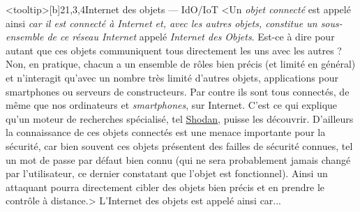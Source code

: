 \begin{quiz}[title={Informatique embarquée et objets connectés}]
\vspace{-\baselineskip}
\begin{quizquestion*}<tooltip>[b]{2}{1,3,4}{Internet des objets --- IdO/IoT}
<Un \emph{objet connecté} est appelé ainsi \emph{car il est connecté à Internet et, avec les autres objets, constitue un sous-ensemble de ce réseau Internet} appelé \emph{Internet des Objets}.
Est-ce à dire pour autant que ces objets communiquent tous directement les uns avec les autres ? Non, en pratique, chacun a un ensemble de rôles bien précis (et limité en général) et n’interagit qu’avec un nombre très limité d’autres objets, applications pour smartphones ou serveurs de constructeurs.
Par contre ils sont tous connectés, de même que nos ordinateurs et \textit{smartphones}, sur Internet. C’est ce qui explique qu’un moteur de recherches spécialisé, tel \href{https://www.shodan.io/}{Shodan}, puisse les découvrir.
D’ailleurs la connaissance de ces objets connectés est une menace importante pour la sécurité, car bien souvent ces objets présentent des failles de sécurité connues, tel un mot de passe par défaut bien connu (qui ne sera probablement jamais changé par l’utilisateur, ce dernier constatant que l’objet est fonctionnel). Ainsi un attaquant pourra directement cibler des objets bien précis et en prendre le contrôle à distance.>
L’Internet des objets est appelé ainsi car... 
\end{quizquestion*}


\end{quiz}
